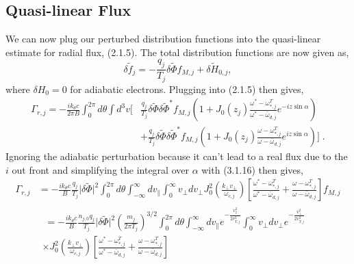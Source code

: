 \documentclass[12pt]{article}
\numberwithin{equation}{subsection}
\begin{document}
\subsection{Quasi-linear Flux}
   \quad We can now plug our perturbed distribution functions into the quasi-linear estimate for radial flux, (2.1.5). The total
distribution functions are now given as,
   \begin{equation}
      \delta \widetilde{f}_j = -\frac{q_j}{T_j}\delta\widetilde{\Phi}f_{M,j} + \delta\widetilde{H}_{0,j},
   \end{equation}
where $\delta H_0 = 0$ for adiabatic electrons. Plugging into (2.1.5) then gives,
   \begin{equation}
   \begin{aligned}
      \Gamma_{r,j} = -\frac{ik_\theta c}{2\pi B}\int_{0}^{2\pi}d\theta\int d^3v
            [&\frac{q_j}{T_j}\delta\widetilde{\Phi}\delta\widetilde{\Phi}^*f_{M,j}(1+J_0(z_j)\frac{\omega^*-\omega^T_{*,j}}{\omega^*-\bar{\omega}_{d,j}}e^{-iz\sin\alpha}) \\
             & + \frac{q_j}{T_j}\delta\widetilde{\Phi}\delta\widetilde{\Phi}^*f_{M,j}(1+J_0(z_j)\frac{\omega-\omega^T_{*,j}}{\omega-\bar{\omega}_{d,j}}e^{iz\sin\alpha})]\;.
   \end{aligned}
   \end{equation}
Ignoring the adiabatic perturbation because it can't lead to a real flux due to the $i$ out front and simplifying the integral over $\alpha$ with
(3.1.16) then gives,
   \begin{equation}
   \begin{aligned}
      \Gamma_{r,j} &= -\frac{ik_\theta c}{B}\frac{q_j}{T_j}\lvert\delta\widetilde{\Phi}\rvert^2\int_{0}^{2\pi}d\theta\int_{-\infty}^{\infty}dv_\parallel
                      \int_{0}^{\infty}v_\perp dv_\perp J_0^2(\frac{k_\perp v_\perp}{\omega_{c,j}})
                      [\frac{\omega^*-\omega^T_{*,j}}{\omega^*-\bar{\omega}_{d,j}} + \frac{\omega-\omega^T_{*,j}}{\omega-\bar{\omega}_{d,j}}]f_{M,j} \\
                   & 
                      \begin{aligned} \;=
                      -\frac{ik_\theta c}{B}\frac{n_{j,0}q_j}{T_j}\lvert\delta\widetilde{\Phi}\rvert^2\left(\frac{m_j}{2\pi T_j}\right)^{3/2}
                      \int_{0}^{2\pi}d\theta\int_{-\infty}^{\infty}dv_\parallel e^{-\frac{v_\parallel^2}{2v_{T,j}^2}}
                      \int_{0}^{\infty}v_\perp dv_\perp e^{-\frac{v_\perp^2}{2v_{T,j}^2}} \\
                      \times J_0^2(\frac{k_\perp v_\perp}{\omega_{c,j}})
                      [\frac{\omega^*-\omega^T_{*,j}}{\omega^*-\bar{\omega}_{d,j}}
                       + \frac{\omega-\omega^T_{*,j}}{\omega-\bar{\omega}_{d,j}}]
                      \end{aligned}
   \end{aligned}
   \end{equation}
\end{document}
